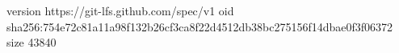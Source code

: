 version https://git-lfs.github.com/spec/v1
oid sha256:754e72c81a11a98f132b26cf3ca8f22d4512db38bc275156f14dbae0f3f06372
size 43840
